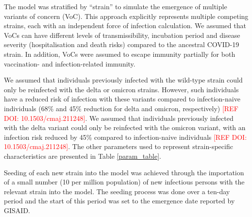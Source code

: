 
The model was stratified by ``strain'' to simulate the emergence of multiple variants of concern (VoC).
This approach explicitly represents multiple competing strains, each with an independent force of infection calculation.
We assumed that VoCs can have different levels of transmissibility, incubation period and disease severity 
(hospitalisation and death risks) compared to the ancestral COVID-19 strain. In addition, VoCs were assumed to escape 
immunity partially for both vaccination- and infection-related immunity. 

We assumed that individuals previously infected with the wild-type strain could only be reinfected with the delta or 
omicron strains. However, such individuals have a reduced risk of infection with these variants compared to 
infection-naive individuals (68\% and 45\% reduction for delta and omicron, respectively) \textcolor{red}{[REF DOI: 10.1503/cmaj.211248]}.
We assumed that individuals previously infected with the delta variant could only be reinfected with the omicron variant, 
with an infection risk reduced by 45\% compared to infection-naive individuals \textcolor{red}{[REF DOI: 10.1503/cmaj.211248]}. 
The other parameters used to represent strain-specific characteristics are presented in Table \ref{param_table}.

Seeding of each new strain into the model was achieved through the importation of a small number (10 per million population) of new infectious persons with the relevant strain into the model.
The seeding process was done over a ten-day period and the start of this period was set to the emergence date reported by GISAID.
